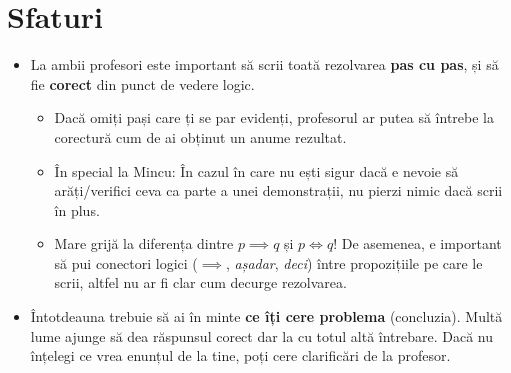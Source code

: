 \newpage

\section*{Sfaturi}
\begin{itemize}
    \item La ambii profesori este important să scrii toată rezolvarea \textbf{pas cu pas}, și să fie \textbf{corect} din punct de vedere logic.
    \begin{itemize}
        \item Dacă omiți pași care ți se par evidenți, profesorul ar putea să întrebe la corectură cum de ai obținut un anume rezultat.
        \item În special la Mincu: În cazul în care nu ești sigur dacă e nevoie să arăți/verifici ceva ca parte a unei demonstrații, nu pierzi nimic dacă scrii în plus.
        \item Mare grijă la diferența dintre \(p \implies q\) și \(p \iff q\)! De asemenea, e important să pui conectori logici (\(\implies\), \emph{așadar}, \emph{deci}) între propozițiile pe care le scrii, altfel nu ar fi clar cum decurge rezolvarea.
    \end{itemize}
    \item Întotdeauna trebuie să ai în minte \textbf{ce îți cere problema} (concluzia). Multă lume ajunge să dea răspunsul corect dar la cu totul altă întrebare. Dacă nu înțelegi ce vrea enunțul de la tine, poți cere clarificări de la profesor.
\end{itemize}
